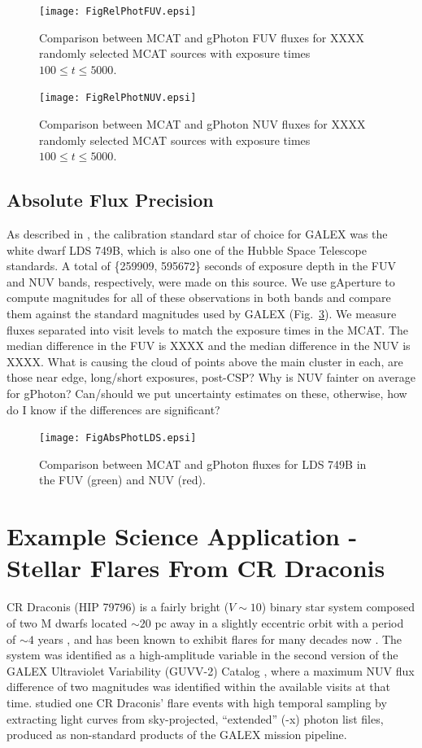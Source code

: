 \documentclass[5p]{elsarticle}
\begin{document}
\begin{figure}
\texttt{[image: FigRelPhotFUV.epsi]}
\caption{Comparison between MCAT and gPhoton FUV fluxes for {\color{red}XXXX} randomly selected MCAT sources with exposure times $100 \leq t \leq 5000$. \label{fuvrelphot}}
\end{figure}

\begin{figure}
\texttt{[image: FigRelPhotNUV.epsi]}
\caption{Comparison between MCAT and gPhoton NUV fluxes for {\color{red}XXXX} randomly selected MCAT sources with exposure times $100 \leq t \leq 5000$. \label{nuvrelphot}}
\end{figure}


\subsection{Absolute Flux Precision}
As described in \citet{mor2007}, the calibration standard star of choice for GALEX was the white dwarf LDS 749B, which is also one of the Hubble Space Telescope standards. A total of \{259909, 595672\} seconds of exposure depth in the FUV and NUV bands, respectively, were made on this source. We use gAperture to compute magnitudes for all of these observations in both bands and compare them against the standard magnitudes used by GALEX (Fig.\ \ref{ldsabsphot}).  We measure fluxes separated into visit levels to match the exposure times in the MCAT.  The median difference in the FUV is {\color{red}XXXX} and the median difference in the NUV is {\color{red}XXXX}.  {\color{red}What is causing the cloud of points above the main cluster in each, are those near edge, long/short exposures, post-CSP?  Why is NUV fainter on average for gPhoton?  Can/should we put uncertainty estimates on these, otherwise, how do I know if the differences are significant?}

\begin{figure}
\texttt{[image: FigAbsPhotLDS.epsi]}
\caption{Comparison between MCAT and gPhoton fluxes for LDS 749B in the FUV (green) and NUV (red). \label{ldsabsphot}}
\end{figure}

\section{Example Science Application - Stellar Flares From CR Draconis}
\label{scienceexamples}
CR Draconis (HIP 79796) is a fairly bright ($V \sim 10$) binary star system composed of two M dwarfs located $\sim 20$ pc away in a slightly eccentric orbit with a period of $\sim 4$ years \citep{tam2008}, and has been known to exhibit flares for many decades now \citep{cri1970}.  The system was identified as a high-amplitude variable in the second version of the GALEX Ultraviolet Variability (GUVV-2) Catalog \citep{whe2008}, where a maximum NUV flux difference of two magnitudes was identified within the available visits at that time.  \citet{wel2006} studied one CR Draconis' flare events with high temporal sampling by extracting light curves from sky-projected, ``extended'' (-x) photon list files, produced as non-standard products of the GALEX mission pipeline.
\end{document}

